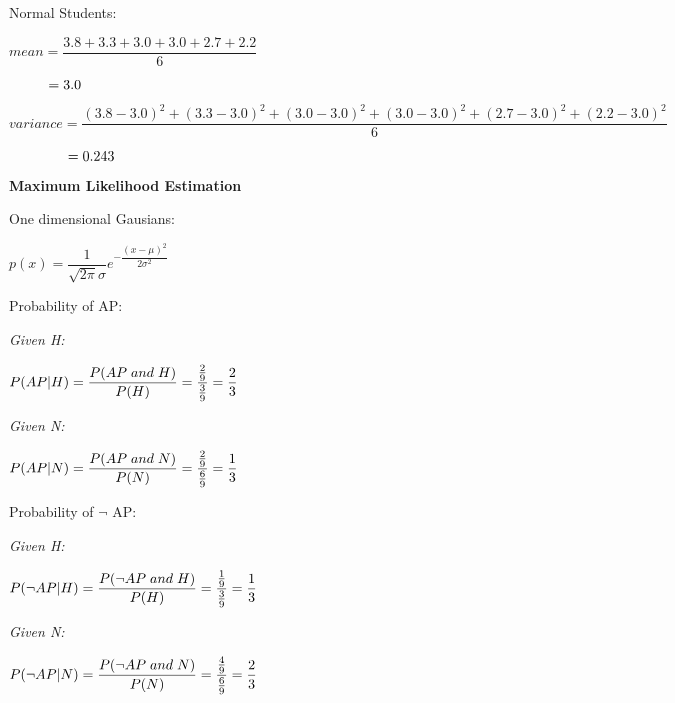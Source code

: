 \documentclass[11pt]{article}
\begin{document}
\noindent Normal Students:\newline

$mean = \dfrac{3.8+3.3+3.0+3.0+2.7+2.2}{6}$\newline

$\hphantom{mean }= 3.0$\newline

$variance = \dfrac{(3.8-3.0)^2 + (3.3-3.0)^2 + (3.0-3.0)^2 + (3.0-3.0)^2 + (2.7-3.0)^2 + (2.2-3.0)^2}{6}$\newline

$\hphantom{variance }= 0.243$\newline

\noindent \textbf{Maximum Likelihood Estimation}\newline

\noindent One dimensional Gausians: \newline



\begin{center}
$p(x) = \dfrac{1}{\sqrt{2\pi}\sigma}e^{-\dfrac{(x-\mu)^2}{2\sigma^2}}$
\end{center}

\noindent Probability of AP: \newline

\textit{Given H:}

\begin{center}
$P(AP|H) = \dfrac{P(AP \kern .1cm and \kern .1cm H)}{P(H)} = \dfrac{\frac{2}{9}}{\frac{3}{9}} = \dfrac{2}{3}$
\end{center}

\textit{Given N:}

\begin{center}
$P(AP|N) = \dfrac{P(AP \kern .1cm and \kern .1cm N)}{P(N)} = \dfrac{\frac{2}{9}}{\frac{6}{9}} = \dfrac{1}{3}$
\end{center}

\noindent Probability of $\neg$ AP: \newline

\textit{Given H:}

\begin{center}
$P(\neg AP|H) = \dfrac{P(\neg AP \kern .1cm and \kern .1cm H)}{P(H)} = \dfrac{\frac{1}{9}}{\frac{3}{9}} = \dfrac{1}{3}$
\end{center}

\textit{Given N:}

\begin{center}
$P(\neg AP|N) = \dfrac{P(\neg AP \kern .1cm and \kern .1cm N)}{P(N)} = \dfrac{\frac{4}{9}}{\frac{6}{9}} = \dfrac{2}{3}$
\end{center}
\end{document}
